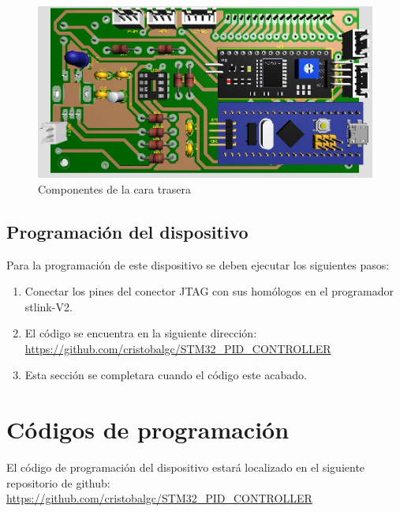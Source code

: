 \documentclass[10pt,a4paper,oneside]{article}
\begin{document}
\begin{figure}[H]
\centering
\includegraphics[scale=0.6]{Imagenes/PCB_COMPONENTES_CARA_TRASERA.jpg}
\caption[Vista de los componentes de la cara trasera de la PCB]{Componentes de la cara trasera}
\label{fig:005}
\end{figure}

\subsection{Programación del dispositivo}%

Para la programación de este dispositivo se deben ejecutar los siguientes pasos:

\begin{enumerate}
	\item Conectar los pines del conector JTAG con sus homólogos en el programador stlink-V2.
	\item El código se encuentra en la siguiente dirección: \url{https://github.com/cristobalgc/STM32_PID_CONTROLLER}
	\item Esta sección se completara cuando el código este acabado.
\end{enumerate}

\section{Códigos de programación}%

El código de programación del dispositivo estará localizado en el siguiente repositorio de github: \url{https://github.com/cristobalgc/STM32_PID_CONTROLLER}

\bigskip
\end{document}
